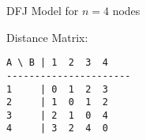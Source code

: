 \documentclass[../open-optimization/open-optimization.tex]{subfiles}
\begin{document}
\begin{example}{DFJ Model for $n=4$ nodes}{}


Distance Matrix:
\begin{verbatim}
A \ B | 1  2  3  4
----------------------
1     | 0  1  2  3
2     | 1  0  1  2
3     | 2  1  0  4
4     | 3  2  4  0
\end{verbatim}





\end{example}
\end{document}
